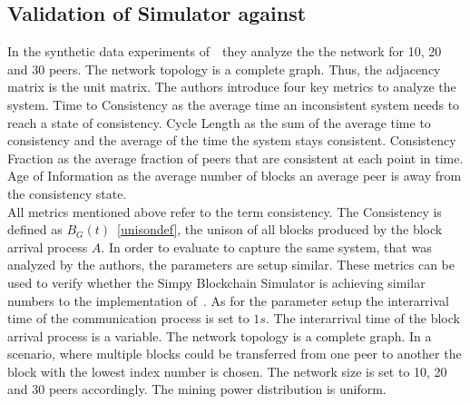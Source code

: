 \subsection{Validation of Simulator against~}\label{gopalananalysis}
In the synthetic data experiments of~~they analyze the the network for 10, 20 and 30 peers. The network topology is a complete graph. Thus, the adjacency matrix is the unit matrix. 
The authors introduce four key metrics to analyze the system. Time to Consistency as the average time an inconsistent system needs to reach a state of consistency. Cycle Length as the sum of the average time to consistency and the average of the time the system stays consistent. Consistency Fraction as the average fraction of peers that are consistent at each point in time. Age of Information as the average number of blocks an average peer is away from the consistency state. \\
All metrics mentioned above refer to the term consistency. The Consistency is defined as $B_G(t)$~\ref{unisondef}, the unison of all blocks produced by the block arrival process $A$.
In order to evaluate to capture the same system, that was analyzed by the authors, the parameters are setup similar.
These metrics can be used to verify whether the Simpy Blockchain Simulator is achieving similar numbers to the implementation of~. As for the parameter setup the interarrival time of the communication process is set to $1s$. The interarrival time of the block arrival process is a variable. The network topology is a complete graph. In a scenario, where multiple blocks could be transferred from one peer to another the block with the lowest index number is chosen. The network size is set to 10, 20 and 30 peers accordingly. The mining power distribution is uniform.
